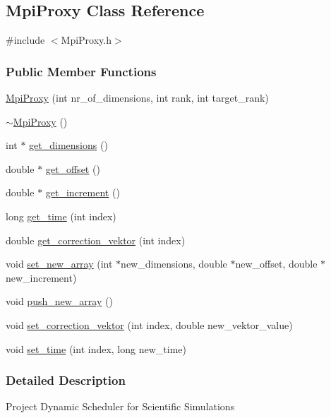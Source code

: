 \hypertarget{a00054}{}\subsection{Mpi\+Proxy Class Reference}
\label{a00054}


{\ttfamily \#include $<$Mpi\+Proxy.\+h$>$}

\subsubsection*{Public Member Functions}
\begin{DoxyCompactItemize}
\item 
\hyperlink{a00054_ad22c1c930a79774e8ffaa83a2d3c4d0a}{Mpi\+Proxy} (int nr\+\_\+of\+\_\+dimensions, int rank, int target\+\_\+rank)
\item 
\hyperlink{a00054_a7ae10385700f03ae8540f51df13b9bd5}{$\sim$\+Mpi\+Proxy} ()
\item 
int $\ast$ \hyperlink{a00054_a20a8ccb288eac8a7afe0685d7d326be6}{get\+\_\+dimensions} ()
\item 
double $\ast$ \hyperlink{a00054_a2fec3ea7837878aec42f111f260e892e}{get\+\_\+offset} ()
\item 
double $\ast$ \hyperlink{a00054_a3d0fdc842c0a2534fefeff5281c48feb}{get\+\_\+increment} ()
\item 
long \hyperlink{a00054_ad61ef78eb8e9c0ce3d6bccf2f31373ed}{get\+\_\+time} (int index)
\item 
double \hyperlink{a00054_a8669e778c6946551fed36437199b3f29}{get\+\_\+correction\+\_\+vektor} (int index)
\item 
void \hyperlink{a00054_a5b23a639ad129acb53669adea92621d1}{set\+\_\+new\+\_\+array} (int $\ast$new\+\_\+dimensions, double $\ast$new\+\_\+offset, double $\ast$new\+\_\+increment)
\item 
void \hyperlink{a00054_a0da318d216e55c3d9e6a0c82eae86ad5}{push\+\_\+new\+\_\+array} ()
\item 
void \hyperlink{a00054_a72e4d7eaa47e6b9e06b699e8c22d6125}{set\+\_\+correction\+\_\+vektor} (int index, double new\+\_\+vektor\+\_\+value)
\item 
void \hyperlink{a00054_acdd2ee63120b275fde43e6c4d5f62f29}{set\+\_\+time} (int index, long new\+\_\+time)
\end{DoxyCompactItemize}


\subsubsection{Detailed Description}
Project Dynamic Scheduler for Scientific Simulations 

